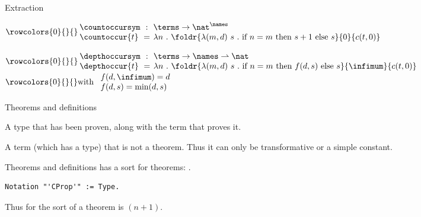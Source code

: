 \begin{frame}{Extraction}
	\begin{definition}
	$
	\rowcolors{0}{}{}
	\arraycolsep=0.2em
	\begin{array}{lcl}
		\countoccursym & : & \terms \rightarrow \nat^{\names} \\
		\countoccur{t} & = & \lambda n ~.~ \foldr{\lambda (m, d)~s ~.~ \text{if~} n = m \text{~then~} s+1 \text{~else~} s}{0}{c(t, 0)}
	\end{array}
	$\\
	\end{definition}
	\bigskip
	\begin{definition}[Depth of symbols $\depthoccursym$]
	$
		\rowcolors{0}{}{}
		\arraycolsep=0.2em
		\begin{array}{lcl}
		\depthoccursym & : & \terms \rightarrow \names \rightharpoonup \nat \\
		\depthoccur{t} & = & \lambda n ~.~ \foldr{\lambda (m, d)~s ~.~ \text{if~} n = m \text{~then~} f(d, s) \text{~else~} s}{\infimum}{c(t, 0)} \\
		\end{array}
	$\\
	\bigskip
	$
		\rowcolors{0}{}{}
		\text{with~} \begin{array}{l}
			f(d, \infimum) = d \\
			f(d, s) = \text{min}(d, s) \\
		\end{array}
	$
	\end{definition}
\end{frame}

\begin{frame}{Theorems and definitions}
	\begin{definition}[Theorem]
		A type that has been proven, along with the term that proves it.
	\end{definition}
	\bigskip
	\begin{definition}[Definition]
		A term (which has a type) that is not a theorem.
		Thus it can only be transformative or a simple constant.
	\end{definition}
\end{frame}

\begin{frame}[fragile]{Theorems and definitions}
	\coq has a sort for theorems: \sortprop.
	\pause
	\bigskip
\begin{lstlisting}[language=Coq, mathescape]
Notation "'CProp'" := Type.
\end{lstlisting}
	\bigskip
	Thus for \corn the sort of a theorem is \sorttype{}$(n+1)$.
\end{frame}

